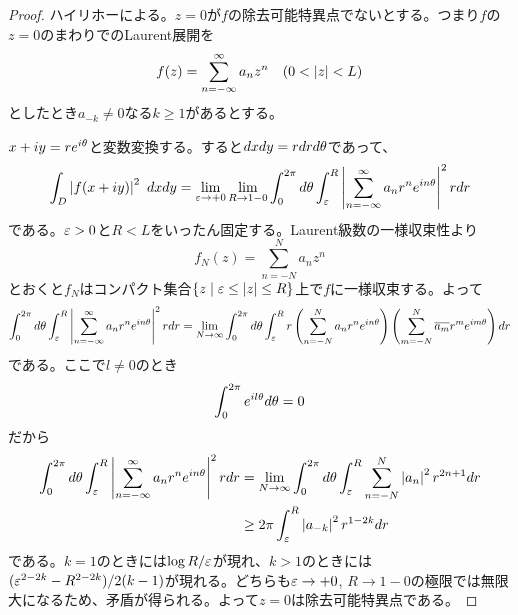 \newpage

\subsubsection{}%
\begin{proof}
  ハイリホーによる。$z=0$が$f$の除去可能特異点でないとする。つまり$f$の$z=0$のまわりでのLaurent展開を
  \[
  f(z) = \sum_{n = - \infty}^{\infty} a_n z^n  \quad (0 < \left \lvert z \right \rvert < L)
  \]
  としたとき$a_{-k} \neq 0$なる$k \geq 1$があるとする。

  $x + i y = r e^{i {\theta}}$と変数変換する。すると$dx dy = r dr d{\theta}$であって、
  \[
  \int_D \left \lvert f(x + iy) \right \rvert^2 \ dx dy = \lim_{{\varepsilon} \to + 0} \lim_{R \to 1- 0} \int_0^{2 \pi} d{\theta} \int_{{\varepsilon}}^{R} \left \lvert  \sum_{n = - \infty}^{\infty} a_n r^n e^{i n {\theta}}  \right \rvert^2 r dr
  \]
  である。${\varepsilon} > 0$と$R < L$をいったん固定する。Laurent級数の一様収束性より
  \[
  f_N(z) = \sum_{n = - N}^{N} a_n z^n
  \]
  とおくと$f_N$はコンパクト集合$\left\{ z \mathrel{} \middle| \mathrel{} {\varepsilon} \leq \left \lvert z \right \rvert \leq R  \right\}$上で$f$に一様収束する。よって
  \[
\int_0^{2 \pi} d{\theta} \int_{{\varepsilon}}^{R} \left \lvert  \sum_{n = - \infty}^{\infty} a_n r^n e^{i n {\theta}}  \right \rvert^2 r dr = \lim_{N \to \infty}
\int_0^{2 \pi} d{\theta} \int_{{\varepsilon}}^{R} r \left( \sum_{n = - N}^{N} a_n r^n e^{i n {\theta}} \right) \left( \sum_{m = - N}^{N}  \overline{a_m} r^m e^{i  m {\theta}} \right)   dr
  \]
  である。ここで$l \neq 0$のとき
  \[
  \int_0^{2 \pi } e^{i l {\theta}} d{\theta} = 0
  \]
  だから
  \begin{align*}
  \int_0^{2 \pi} d{\theta} \int_{{\varepsilon}}^{R} \left \lvert  \sum_{n = - \infty}^{\infty} a_n r^n e^{i n {\theta}}  \right \rvert^2 r dr &=
  \lim_{N \to \infty} \int_0^{2 \pi} d {\theta} \int_{{\varepsilon}}^{R} \sum_{n = -N}^{N} \left \lvert a_n \right \rvert^2 r^{2n+1} dr \\
  &\geq 2 \pi  \int_{{\varepsilon}}^{R} \left \lvert a_{-k} \right \rvert^2 r^{1-2k} dr
\end{align*}
である。$k=1$のときには$\log R/{\varepsilon}$が現れ、$k>1$のときには$({\varepsilon}^{2-2k}-R^{2-2k})/2(k-1)$が現れる。どちらも${\varepsilon} \to +0$, $R \to 1 - 0$の極限では無限大になるため、矛盾が得られる。よって$z=0$は除去可能特異点である。
\end{proof}
